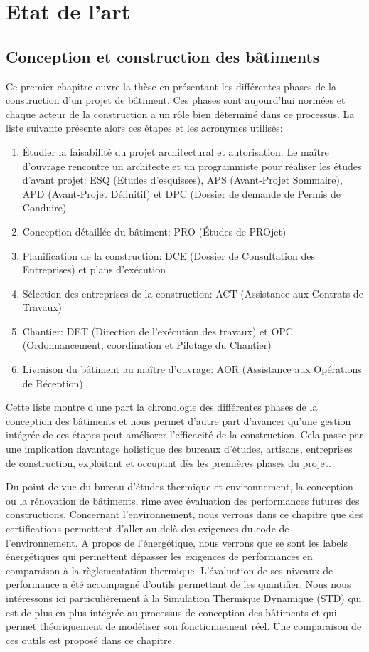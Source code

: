 \part{Etat de l'art}

\chapter{Conception et construction des bâtiments}

Ce premier chapitre ouvre la thèse en présentant les différentes phases de la construction d'un projet de bâtiment. Ces phases sont aujourd'hui normées et chaque acteur de la construction a un rôle bien déterminé dans ce processus. La liste suivante présente alors ces étapes et les acronymes utilisés:

\begin{enumerate}
  \item Étudier la faisabilité du projet architectural et autorisation. Le maître d'ouvrage rencontre un architecte et un programmiste pour réaliser les études d'avant projet: ESQ (Etudes d'esquisses), APS (Avant-Projet Sommaire), APD (Avant-Projet Définitif) et DPC (Dossier de demande de Permis de Conduire)
  \item Conception détaillée du bâtiment: PRO (Études de PROjet)
  \item Planification de la construction: DCE (Dossier de Consultation des Entreprises) et plans d'exécution
  \item Sélection des entreprises de la construction: ACT (Assistance aux Contrats de Travaux)
  \item Chantier: DET (Direction de l'exécution des travaux) et OPC (Ordonnancement, coordination et Pilotage du Chantier)
  \item Livraison du bâtiment au maître d'ouvrage: AOR (Assistance aux Opérations de Réception)
\end{enumerate}

Cette liste montre d'une part la chronologie des différentes phases de la conception des bâtiments et nous permet d'autre part d'avancer qu'une gestion intégrée de ces étapes peut améliorer l'efficacité de la construction. Cela passe par une implication davantage holistique des bureaux d'études, artisans, entreprises de construction, exploitant et occupant dès les premières phases du projet.

Du point de vue du bureau d'études thermique et environnement, la conception ou la rénovation de bâtiments, rime avec évaluation des performances futures des constructions. Concernant l'environnement, nous verrons dans ce chapitre que des certifications permettent d'aller au-delà des exigences du code de l'environnement. A propos de l'énergétique, nous verrons que se sont les labels énergétiques qui permettent dépasser les exigences de performances en comparaison à la règlementation thermique. L'évaluation de ses niveaux de performance a été accompagné d'outils permettant de les quantifier. Nous nous intéressons ici particulièrement à la Simulation Thermique Dynamique (STD) qui est de plus en plus intégrée au processus de conception des bâtiments et qui permet théoriquement de modéliser son fonctionnement réel. Une comparaison de ces outils est proposé dans ce chapitre.


